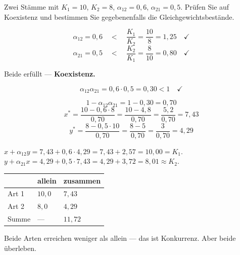 \begin{aufgabe}
Zwei Stämme mit $K_1 = 10$, $K_2 = 8$, $\alpha_{12} = 0{,}6$, $\alpha_{21} = 0{,}5$. Prüfen Sie auf Koexistenz und bestimmen Sie gegebenenfalls die Gleichgewichtsbestände.

\loesung
{}
\[ \alpha_{12} = 0{,}6 \quad<\quad \frac{K_1}{K_2} = \frac{10}{8} = 1{,}25 \quad \checkmark \]
\[ \alpha_{21} = 0{,}5 \quad<\quad \frac{K_2}{K_1} = \frac{8}{10} = 0{,}80 \quad \checkmark \]

Beide erfüllt --- \textbf{Koexistenz.}

\[ \alpha_{12}\alpha_{21} = 0{,}6 \cdot 0{,}5 = 0{,}30 < 1 \quad \checkmark \]

\[ 1 - \alpha_{12}\alpha_{21} = 1 - 0{,}30 = 0{,}70 \]
\[ x^{*} = \frac{10 - 0{,}6\cdot8}{0{,}70} = \frac{10 - 4{,}8}{0{,}70} = \frac{5{,}2}{0{,}70} = 7{,}43 \]
\[ y^{*} = \frac{8 - 0{,}5\cdot10}{0{,}70} = \frac{8 - 5}{0{,}70} = \frac{3}{0{,}70} = 4{,}29 \]

 $x + \alpha_{12}y = 7{,}43 + 0{,}6 \cdot 4{,}29 = 7{,}43 + 2{,}57 = 10{,}00 = K_1$. \checkmark\\
 $y + \alpha_{21}x = 4{,}29 + 0{,}5 \cdot 7{,}43 = 4{,}29 + 3{,}72 = 8{,}01 \approx K_2$. \checkmark

\begin{center}
\renewcommand{\arraystretch}{1.48}
\begin{tabular}{@{}P{2.8cm}P{2.0cm}P{2.4cm}@{}}
\toprule
& \textbf{allein} & \textbf{zusammen}\\
\midrule
Art 1 & $10{,}0$ & $7{,}43$\\
Art 2 & $8{,}0$ & $4{,}29$\\
\midrule
Summe & --- & $11{,}72$\\
\bottomrule
\end{tabular}
\end{center}

Beide Arten erreichen weniger als allein --- das ist Konkurrenz. Aber beide überleben.

\begin{center}
\begin{minipage}{0.86\textwidth}
\end{minipage}
\end{center}
\end{aufgabe}

